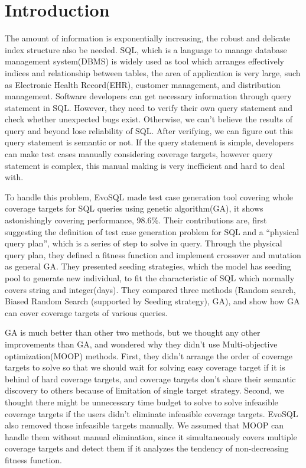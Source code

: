 \chapter{Introduction}

The amount of information is exponentially increasing, the robust and delicate index structure also be needed. SQL, which is a language to manage database management system(DBMS) is widely used as tool which arranges effectively indices and relationship between tables, the area of application is very large, such as Electronic Health Record(EHR), customer management, and distribution management. Software developers can get necessary information through query statement in SQL. However, they need to verify their own query statement and check whether unexpected bugs exist. Otherwise, we can't believe the results of query and beyond lose reliability of SQL. After verifying, we can figure out this query statement is semantic or not. If the query statement is simple, developers can make test cases manually considering coverage targets, however query statement is complex, this manual making is very inefficient and hard to deal with. 

To handle this problem, EvoSQL made test case generation tool covering whole coverage targets for SQL queries using genetic algorithm(GA), it shows astonishingly covering performance, 98.6\%. Their contributions are, first suggesting the definition of test case generation problem for SQL and a ``physical query plan'', which is a series of step to solve in query. Through the physical query plan, they defined a fitness function and implement crossover and mutation as general GA. They presented seeding strategies, which the model has seeding pool to generate new individual, to fit the characteristic of SQL which normally covers string and integer(days). They compared three methods (Random search, Biased Random Search (supported by Seeding strategy), GA), and show how GA can cover coverage targets of various queries.

 GA is much better than other two methods, but we thought any other improvements than GA, and wondered why they didn't use Multi-objective optimization(MOOP) methods. First, they didn't arrange the order of coverage targets to solve so that we should wait for solving easy coverage target if it is behind of hard coverage targets, and coverage targets don't share their semantic discovery to others because of limitation of single target strategy. Second, we thought there might be unnecessary time budget to solve to solve infeasible coverage targets if the users didn't eliminate infeasible coverage targets. EvoSQL also removed those infeasible targets manually. We assumed that MOOP can handle them without manual elimination, since it simultaneously covers multiple coverage targets and detect them if it analyzes the tendency of non-decreasing fitness function.
 
